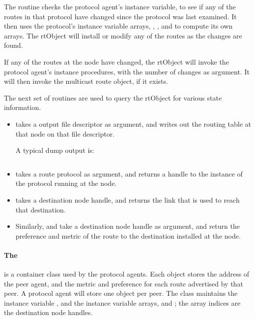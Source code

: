 \begin{itemize}
The routine checks the protocol agent's instance variable,
 to see if any of the routes in that protocol
have changed since the protocol was last examined.
It then uses the protocol's instance variable arrays,
, , and 
to compute its own arrays.
The rtObject will install or modify any of the routes as the changes are found.

If any of the routes at the node have changed,
the rtObject will invoke the protocol agent's instance procedures,
 with the number of changes as argument.
It will then invoke the multicast route object, if it exists.
\end{itemize}

The next set of routines are used to query the rtObject for various state
information.
\begin{itemize}
\item
{}
takes a output file descriptor as argument, and writes out the
routing table at that node on that file descriptor.

A typical dump output is:
{\small
\begin{verbatim}
\end{verbatim}
}

\item
{}
takes a route protocol as argument, and returns a handle to the instance
of the protocol running at the  node.

\item
{}
takes a destination node handle, and returns the link that is used to reach
that destination.

\item
Similarly,
 and
take a destination node handle as argument, and return the preference
and metric of the route to the destination installed at the node.
\end{itemize}

\paragraph{The \protect{}}
is a container class used by the protocol agents.
Each object stores the address of the peer agent, and the 
metric and preference for each route advertised by that peer.
A protocol agent will store one object per peer.
The class maintains the instance variable , and the
instance variable arrays,  and ;
the array indices are the destination node handles.

